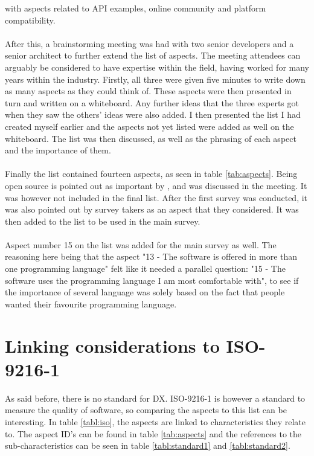 \documentclass{cslthse-msc}
\begin{document}
    with aspects related to API examples, online community and  platform compatibility.
    \\ \\
    After this, a brainstorming meeting was had with two senior developers and a
    senior architect to further extend the list of aspects. The meeting attendees can arguably be considered
    to have expertise within the field, having worked for many years within the industry.
    Firstly, all three
    were given five minutes to write down as many aspects as they could think of.
    These aspects were then presented in turn and written on a whiteboard. Any further ideas
    that the three experts got when they saw the others' ideas were also added.
    I then presented the list I had created myself earlier and the aspects not yet listed were added
    as well on the whiteboard. The list was then discussed, as well as the phrasing of each aspect and the importance
    of them.
    \\ \\
    Finally the list contained fourteen aspects, as seen in table \ref{tab:aspects}.
    Being open source is pointed out as important by \citet{jarman}, and was discussed in the meeting.
    It was however not included in the final list. After the first survey was conducted, it was
    also pointed out by survey takers as an aspect that they considered. It was then
    added to the list to be used in the main survey.
    \\ \\
    Aspect number 15 on the list was
    added for the main survey as well. The reasoning here being that the aspect
    "13 - The software is offered in more than one programming language" felt
    like it needed a parallel question: "15 - The software uses the programming language I am most comfortable with",
    to see if the importance of several language was solely based on the fact that
    people wanted their favourite programming language.


    \section{Linking considerations to ISO-9216-1}\label{sec:linking}

    As said before, there is no standard for DX. ISO-9216-1 is however a standard
    to measure the quality of software, so comparing the aspects to this list can
    be interesting. In table \ref{tabl:iso}, the aspects are linked to characteristics they relate to. The aspect ID's can
    be found in table \ref{tab:aspects} and the references to the sub-characteristics can be seen in table \ref{tabl:standard1} and \ref{tabl:standard2}.
\end{document}
